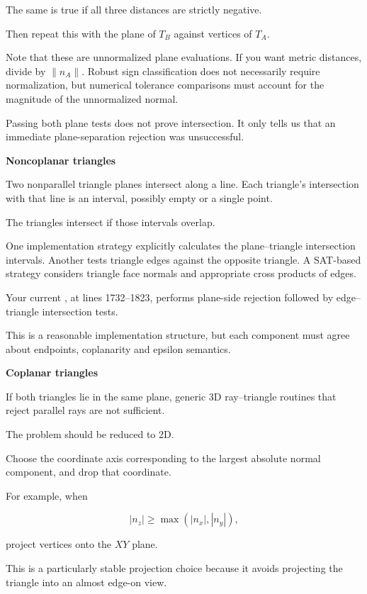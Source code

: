 The same is true if all three distances are strictly negative.

Then repeat this with the plane of \(T_B\) against vertices of \(T_A\).

Note that these are unnormalized plane evaluations. If you want metric distances, divide by \(\|n_A\|\). Robust sign classification does not necessarily require normalization, but numerical tolerance comparisons must account for the magnitude of the unnormalized normal.

Passing both plane tests does not prove intersection. It only tells us that an immediate plane-separation rejection was unsuccessful.

\textbf{Noncoplanar triangles}

Two nonparallel triangle planes intersect along a line. Each triangle's intersection with that line is an interval, possibly empty or a single point.

The triangles intersect if those intervals overlap.

One implementation strategy explicitly calculates the plane--triangle intersection intervals. Another tests triangle edges against the opposite triangle. A SAT-based strategy considers triangle face normals and appropriate cross products of edges.

Your current ,  at lines 1732--1823, performs plane-side rejection followed by edge--triangle intersection tests.

This is a reasonable implementation structure, but each component must agree about endpoints, coplanarity and epsilon semantics.

\textbf{Coplanar triangles}

If both triangles lie in the same plane, generic 3D ray--triangle routines that reject parallel rays are not sufficient.

The problem should be reduced to 2D.

Choose the coordinate axis corresponding to the largest absolute normal component, and drop that coordinate.

For example, when

\[
|n_z|\ge\max(|n_x|,|n_y|),
\]

project vertices onto the \(XY\) plane.

This is a particularly stable projection choice because it avoids projecting the triangle into an almost edge-on view.

